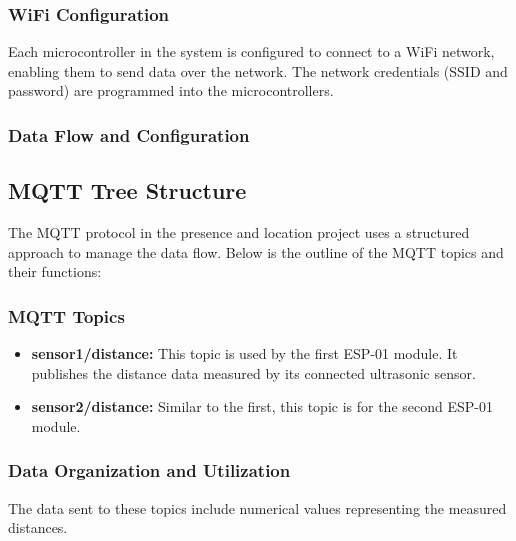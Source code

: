 \documentclass{article}
\begin{document}
\subsubsection{WiFi Configuration}
Each microcontroller in the system is configured to connect to a WiFi network, enabling them to send data over the network. The network credentials (SSID and password) are programmed into the microcontrollers.

\subsubsection{Data Flow and Configuration}

\subsection{MQTT Tree Structure}
The MQTT protocol in the presence and location project uses a structured approach to manage the data flow. Below is the outline of the MQTT topics and their functions:

\subsubsection{MQTT Topics}
\begin{itemize}
    \item \textbf{sensor1/distance:} This topic is used by the first ESP-01 module. It publishes the distance data measured by its connected ultrasonic sensor.
    \item \textbf{sensor2/distance:} Similar to the first, this topic is for the second ESP-01 module.
\end{itemize}

\subsubsection{Data Organization and Utilization}
The data sent to these topics include numerical values representing the measured distances. 
\end{document}
